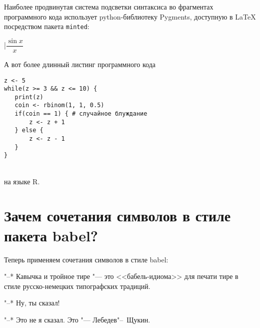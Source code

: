 \documentclass{article}
\begin{document}
Наиболее продвинутая система подсветки синтаксиса  во фрагментах программного кода использует python-библиотеку Pygments, доступную в  \LaTeX{} посредством пакета \texttt{minted}:



|$\dfrac{\sin x}{x} $ %

\bigskip{}
\medskip

А вот более длинный листинг программного кода 

\begin{verbatim}
z <- 5
while(z >= 3 && z <= 10) {
   print(z)
   coin <- rbinom(1, 1, 0.5)
   if(coin == 1) { # случайное блуждание
       z <- z + 1
   } else {
       z <- z - 1
   }
}
\end{verbatim} 
\\
на языке R.

\section{Зачем сочетания символов в стиле пакета babel?}

Теперь применяем сочетания символов в стиле \textsf{babel}: 

"--* Кавычка и тройное тире  "--- это  <<бабель-идиома>>  для печати тире в стиле русско-немецких типографских традиций.

"--* Ну, ты сказал!  

"--* Это не я сказал. Это "--- Лебедев"--~Щукин.
\end{document}

